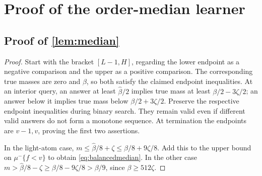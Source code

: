\section{Proof of the order-median learner}\label{app:proofs-C}

\subsection[Proof of result median]{Proof of \cref{lem:median}}\label{proof:median}
\begin{proof}
Start with the bracket $[L-1,H]$, regarding the lower endpoint as a negative comparison and the upper as a positive comparison. The corresponding true masses are zero and $\beta$, so both satisfy the claimed endpoint inequalities. At an interior query, an answer at least $\widehat\beta/2$ implies true mass at least $\beta/2-3\zeta/2$; an answer below it implies true mass below $\beta/2+3\zeta/2$. Preserve the respective endpoint inequalities during binary search. They remain valid even if different valid answers do not form a monotone sequence. At termination the endpoints are $v-1,v$, proving the first two assertions.

In the light-atom case, $m\le\widehat\beta/8+\zeta\le\beta/8+9\zeta/8$. Add this to the upper bound on $\mu^-\{f<v\}$ to obtain \eqref{eq:balancedmedian}. In the other case $m>\widehat\beta/8-\zeta\ge\beta/8-9\zeta/8>\beta/9$, since $\beta\ge512\zeta$.
\end{proof}

